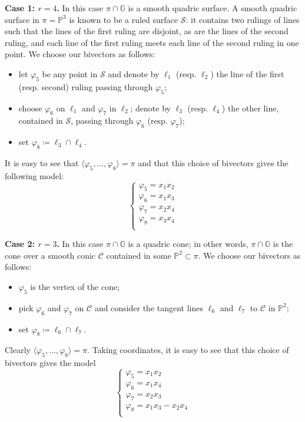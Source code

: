 \documentclass[10pt,reqno]{amsart}
\newcommand{\la}{\langle}
\newcommand{\ra}{\rangle}
\newcommand{\GG}{\mathbb{G}}
\newcommand{\PP}{\mathbb P}
\newcommand{\f}{\varphi}
\theoremstyle{definition}
\begin{document}
\noindent \textbf{Case 1: $r=4$.} In this case $\pi \cap \GG$ is a smooth quadric surface. A smooth quadric surface in $\pi=\PP^3$ is known to be a ruled surface $\mathcal{S}$: it contains two rulings of lines such that the lines of the first ruling are disjoint, as are the lines of the second ruling, and each line of the first ruling meets each line of the second ruling in one point. We choose our bivectors as follows:
\begin{itemize}
    \item let $\f_5$ be any point in $\mathcal{S}$ and denote by $\ell_1$ (resp. $\ell_2$) the line of the first (resp. second) ruling passing through $\f_5$;
    \item choose $\f_6$ on $\ell_1$ and $\f_7$ in $\ell_2$; denote by $\ell_3$ (resp. $\ell_4$) the other line, contained in $\mathcal{S}$, passing through $\f_6$ (resp. $\f_7$);
    \item set $\f_8\coloneqq \ell_3\cap\ell_4$.
\end{itemize}
It is easy to see that $\la\f_5,\ldots,\f_8\ra=\pi$ and that this choice of bivectors gives the following model:
\[
\begin{cases}
\f_5=x_1x_2 \\
\f_6=x_1x_3 \\
\f_7=x_2x_4 \\
\f_8=x_3x_4 \\
\end{cases}
\]

\noindent \textbf{Case 2: $r=3$.} In this case $\pi \cap \GG$ is a quadric cone; in other words, $\pi \cap \GG$ is the cone over a smooth conic $\mathscr{C}$ contained in some $\PP^2\subset\pi$. We choose our bivectors as follows:
\begin{itemize}
    \item $\f_5$ is the vertex of the cone;  
    \item pick $\f_6$ and $\f_7$ on $\mathscr{C}$ and consider the tangent lines $\ell_6$ and $\ell_7$ to $\mathscr{C}$ in $\PP^2$;
    \item set $\f_8\coloneqq \ell_6\cap\ell_7$.
\end{itemize}
Clearly $\la\f_5,\ldots,\f_8\ra=\pi$. Taking coordinates, it is easy to see that this choice of bivectors gives the model
\[
\begin{cases}
\f_5=x_1x_2 \\
\f_6=x_1x_4 \\
\f_7=x_2x_3 \\
\f_8=x_1x_3-x_2x_4 \\
\end{cases}
\]
\end{document}
